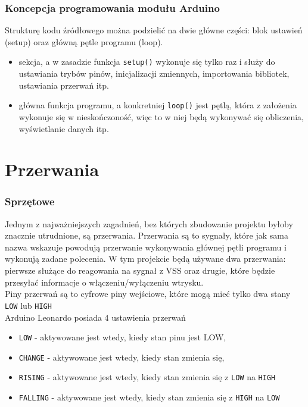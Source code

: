 \subsubsection{Koncepcja programowania modułu Arduino}
Strukturę kodu źródłowego można podzielić na dwie główne części: blok ustawień (setup) oraz główną pętle programu (loop).
\begin{itemize}
\item{sekcja, a w zasadzie funkcja \texttt{setup()} wykonuje się tylko raz i służy do ustawiania trybów pinów, inicjalizacji zmiennych, importowania bibliotek, ustawiania przerwań itp.}
\item{główna funkcja programu, a konkretniej \texttt{loop()} jest pętlą, która z założenia wykonuje się w nieskończoność, więc to w niej będą wykonywać się obliczenia, wyświetlanie danych itp.}
\end{itemize}

\section{Przerwania}
\subsubsection{Sprzętowe}
Jednym z najważniejszych zagadnień, bez których zbudowanie projektu byłoby znacznie utrudnione, są przerwania. Przerwania są to sygnały, które jak sama nazwa wskazuje powodują przerwanie wykonywania głównej pętli programu i wykonują zadane polecenia. W tym projekcie będą używane dwa przerwania: pierwsze służące do reagowania na sygnał z VSS oraz drugie, które będzie przesyłać informacje o włączeniu/wyłączeniu wtrysku.\\

Piny przerwań są to cyfrowe piny wejściowe, które mogą mieć tylko dwa stany \texttt{LOW} lub \texttt{HIGH}\\

Arduino Leonardo posiada 4 ustawienia przerwań \cite{ard_ref}
\begin{itemize}
    \item \texttt{LOW} - aktywowane jest wtedy, kiedy stan pinu jest LOW,
    \item \texttt{CHANGE} - aktywowane jest wtedy, kiedy stan zmienia się,
    \item \texttt{RISING} - aktywowane jest wtedy, kiedy stan zmienia się z \texttt{LOW} na \texttt{HIGH} 
    \item \texttt{FALLING} - aktywowane jest wtedy, kiedy stan zmienia się z \texttt{HIGH} na \texttt{LOW} 
\end{itemize}

